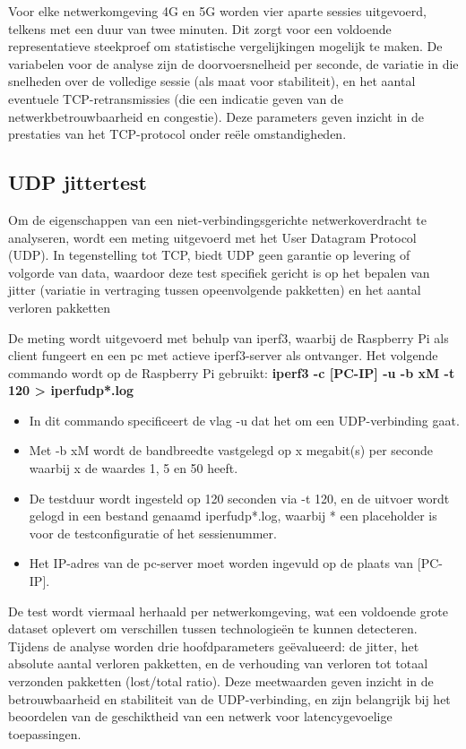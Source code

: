 Voor elke netwerkomgeving 4G en 5G worden vier aparte sessies uitgevoerd, telkens met een duur van twee minuten. Dit zorgt voor een voldoende representatieve steekproef om statistische vergelijkingen mogelijk te maken. 
De variabelen voor de analyse zijn de doorvoersnelheid per seconde, de variatie in die snelheden over de volledige sessie (als maat voor stabiliteit), en het aantal eventuele TCP-retransmissies (die een indicatie geven van de  netwerkbetrouwbaarheid en congestie). Deze parameters geven inzicht in de prestaties van het TCP-protocol onder reële omstandigheden.

\subsection{UDP jittertest}
Om de eigenschappen van een niet-verbindingsgerichte netwerkoverdracht te analyseren, wordt een meting uitgevoerd met het User Datagram Protocol (UDP). In tegenstelling tot TCP, biedt UDP geen garantie op levering of volgorde van data, waardoor deze test specifiek gericht is op het bepalen van jitter (variatie in vertraging tussen opeenvolgende pakketten) en het aantal verloren pakketten


De meting wordt uitgevoerd met behulp van iperf3, waarbij de Raspberry Pi als client fungeert en een pc met actieve iperf3-server als ontvanger. Het volgende commando wordt op de Raspberry Pi gebruikt: \textbf{iperf3 -c [PC-IP] -u -b xM -t 120 > iperfudp*.log}

\begin{itemize}
    \item In dit commando specificeert de vlag -u dat het om een UDP-verbinding gaat. 
    \item Met -b xM wordt de bandbreedte vastgelegd op x megabit(s) per seconde waarbij x de waardes 1, 5 en 50 heeft.
    \item De testduur wordt ingesteld op 120 seconden via -t 120, en de uitvoer wordt gelogd in een bestand genaamd iperfudp*.log, waarbij * een placeholder is voor de testconfiguratie of het sessienummer. 
    \item Het IP-adres van de pc-server moet worden ingevuld op de plaats van [PC-IP].
\end{itemize}


De test wordt viermaal herhaald per netwerkomgeving, wat een voldoende grote dataset oplevert om verschillen tussen technologieën te kunnen detecteren. 
Tijdens de analyse worden drie hoofdparameters geëvalueerd: de jitter, het absolute aantal verloren pakketten, en de verhouding van verloren tot totaal verzonden pakketten (lost/total ratio). Deze meetwaarden geven inzicht in de betrouwbaarheid en stabiliteit van de UDP-verbinding, en zijn belangrijk bij het beoordelen van de geschiktheid van een netwerk voor latencygevoelige toepassingen.



